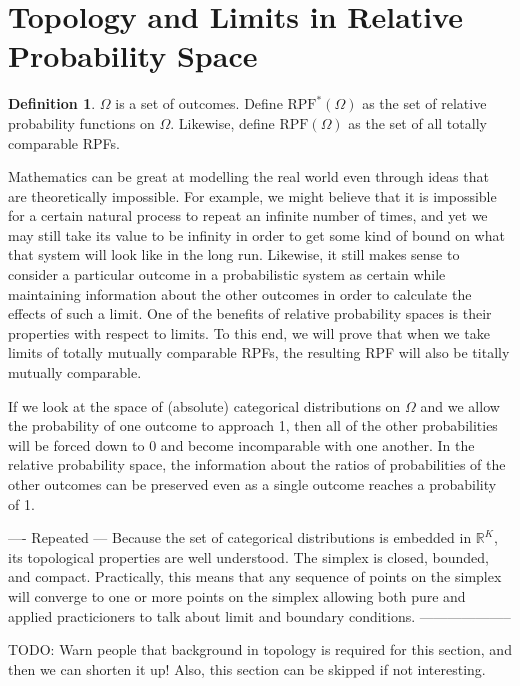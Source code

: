 \documentclass[twoside]{article}
\theoremstyle{plain}%
\theoremstyle{definition}
\newtheorem{definition}{Definition}[section]
\theoremstyle{remark}
\begin{document}
\section{Topology and Limits in Relative Probability Space}

\begin{definition}
\(\Omega\) is a set of outcomes. Define \(\text{RPF}^{\ast}(\Omega)\) as the set of relative probability functions on \(\Omega\). Likewise, define \(\text{RPF}(\Omega)\) as the set of all totally comparable RPFs. 
\end{definition}

Mathematics can be great at modelling the real world even through ideas that are theoretically impossible. For example, we might believe that it is impossible for a certain natural process to repeat an infinite number of times, and yet we may still take its value to be infinity in order to get some kind of bound on what that system will look like in the long run. Likewise, it still makes sense to consider a particular outcome in a probabilistic system as certain while maintaining information about the other outcomes in order to calculate the effects of such a limit. One of the benefits of relative probability spaces is their properties with respect to limits. To this end, we will prove that when we take limits of totally mutually comparable RPFs, the resulting RPF will also be titally mutually comparable.

If we look at the space of (absolute) categorical distributions on \(\Omega\) and we allow the probability of one outcome to approach 1, then all of the other probabilities will be forced down to 0 and become incomparable with one another. In the relative probability space, the information about the ratios of probabilities of the other outcomes can be preserved even as a single outcome reaches a probability of 1.

---- Repeated ---
Because the set of categorical distributions is embedded in \(\mathbb{R}^K\),
its topological properties are well understood. The simplex is closed, bounded,
and compact. Practically, this means that any sequence of points on the
simplex will converge to one or more points on the simplex allowing both pure and applied practicioners to talk about limit and boundary conditions.
--------------------

TODO: Warn people that background in topology is required for this section, and then we can shorten it up! Also, this section can be skipped if not interesting.
\end{document}
